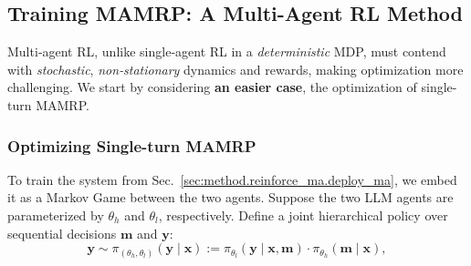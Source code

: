 \subsection{Training MAMRP: A Multi-Agent RL Method}
\label{sec:method.reinforce_ma.it_train}
Multi‐agent RL, unlike single‐agent RL in a \textit{deterministic} MDP, must contend with \textit{stochastic}, \textit{non‐stationary} dynamics and rewards, making optimization more challenging.
We start by considering \textbf{an easier case}, the optimization of single-turn MAMRP.

\subsubsection{Optimizing Single-turn MAMRP}
\label{sec:method.reinforce_ma.single_turn}
To train the system from Sec.~\ref{sec:method.reinforce_ma.deploy_ma}, we embed it as a Markov Game between the two agents. Suppose the two LLM agents are parameterized by $\theta_h$ and $\theta_l$, respectively.
Define a joint hierarchical policy over sequential decisions $\mathbf{m}$ and $\mathbf{y}$:
\begin{equation} 
    \mathbf{y}\sim\pi_{(\theta_h, \theta_l)}(\mathbf{y} \mid \mathbf{x})
    :=
    \pi_{\theta_l}(\mathbf{y} \mid 
    \mathbf{x}, \mathbf{m}) 
    \cdot
    \pi_{\theta_h}(\mathbf{m}\mid
    \mathbf{x}),
    \label{eq:joint_policy}
\end{equation}
